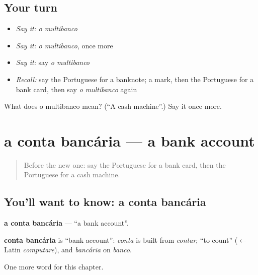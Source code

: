 \subsection*{Your turn}
\begin{itemize}
\raggedright
  \item \emph{Say it:} \emph{o multibanco}
  \item \emph{Say it:} \emph{o multibanco}, once more
  \item \emph{Say it:} say \emph{o multibanco}
  \item \emph{Recall:} say the Portuguese for a banknote; a mark, then the Portuguese for a bank card, then say \emph{o multibanco} again
\end{itemize}

\begin{tcolorbox}[breakable,colback=teal!4,colframe=teal!35!black,title={Before you move on}]
What does o multibanco mean? (\textquotedblleft{}A cash machine\textquotedblright{}.) Say it once more.
\end{tcolorbox}
\section[a conta bancária]{a conta bancária — a bank account}

\label{lesson:PT-C248-conta-bancaria}



\begin{quote}
Before the new one: say the Portuguese for a bank card, then the Portuguese for a cash machine.
\end{quote}

\subsection*{You'll want to know: a conta bancária}
\textbf{a conta bancária} — \textquotedblleft{}a bank account\textquotedblright{}.

\begin{cousinweb}
\textbf{conta bancária} is \textquotedblleft{}bank account\textquotedblright{}: \emph{conta} is built from \emph{contar}, \textquotedblleft{}to count\textquotedblright{} ($\leftarrow$ Latin \emph{computare}), and \emph{bancária} on \emph{banco}.
\end{cousinweb}

\begin{grammarlens}[title={What you've built}]
One more word for this chapter.
\end{grammarlens}

